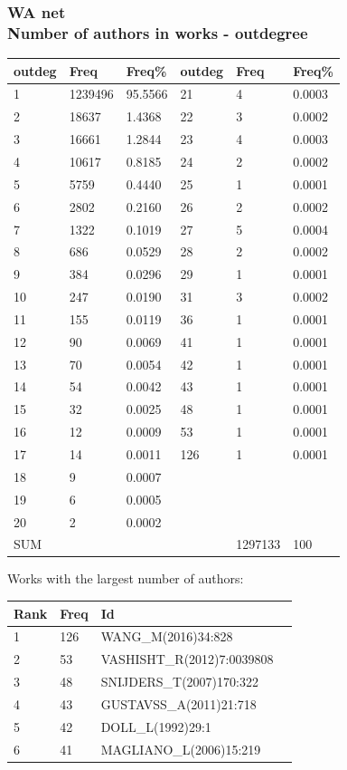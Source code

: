 \documentclass[hyperref={pdfstartview={FitBH -32768},
                         pdfpagemode=FullScreen,
                         plainpages=false,
                         colorlinks=true}
              ]{beamer}
\begin{document}
\begin{frame}[fragile]
\frametitle{WA net \label{numpap}\\ \normalsize Number of authors in works - outdegree}
\renewcommand{\arraystretch}{0.85}
\tiny
\begin{center}
\begin{tabular}{l|l|l||l|l|l}
outdeg&  	Freq&  	Freq\% &  	outdeg&   Freq &	Freq\%\\ \hline   
1&  	1239496&  	95.5566&  	21&  	4&  	0.0003\\
2&  	18637&  	1.4368&  	22&  	3&  	0.0002\\
3&  	16661&  	1.2844&  	23&  	4&  	0.0003\\
4&  	10617&  	0.8185&  	24&  	2&  	0.0002\\
5&  	5759&  	0.4440&  	25&  	1&  	0.0001\\
6&  	2802&  	0.2160&  	26&  	2&  	0.0002\\
7&  	1322&  	0.1019&  	27&  	5&  	0.0004\\
8&  	686&  	0.0529&  	28&  	2&  	0.0002\\
9&  	384&  	0.0296&  	29&  	1&  	0.0001\\
10&  	247&  	0.0190&  	31&  	3&  	0.0002\\
11&  	155&  	0.0119&  	36&  	1&  	0.0001\\
12&  	90&  	0.0069&  	41&  	1&  	0.0001\\
13&  	70&  	0.0054&  	42&  	1&  	0.0001\\
14&  	54&  	0.0042&  	43&  	1&  	0.0001\\
15&  	32&  	0.0025&  	48&  	1&  	0.0001\\
16&  	12&  	0.0009&  	53&  	1&  	0.0001\\
17&  	14&  	0.0011&  	126&  	1&  	0.0001\\
18&  	9&  	0.0007&  	  & 	 & 	\\
19&  	6&  	0.0005&  	 &	 &	\\
20&  	2&  	0.0002&  	&	 &	\\ \hline
SUM &     &              &       &  1297133 & 100  \\ \hline   
\end{tabular}
\end{center}
\medskip

\footnotesize
Works with the largest number of authors:
\medskip
\begin{center}
\renewcommand{\arraystretch}{0.82}
\tiny 
\begin{tabular}{l|l|l|l|}
     Rank    & Freq & Id \\ \hline
         1   & 126  & WANG\_M(2016)34:828 \\
         2    & 53   & VASHISHT\_R(2012)7:0039808 \\ 
         3      & 48  & SNIJDERS\_T(2007)170:322 \\ 
         4     & 43  & GUSTAVSS\_A(2011)21:718  \\ 
         5    & 42   & DOLL\_L(1992)29:1 \\ 
         6   &41 &  MAGLIANO\_L(2006)15:219 \\ \hline
\end{tabular}
\end{center}


\end{frame}
\end{document}
